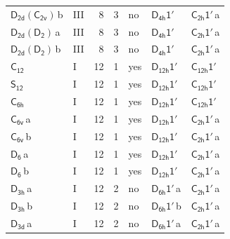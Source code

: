 \documentclass[10pt,a4paper]{article}
\numberwithin{equation}{section}
\newcommand{\grp}[1]{\mathsf{#1}}
\newcommand{\clsletter}[1]{\,{\scriptsize\color{black!55}#1}}
\begin{document}
{\begin{longtable}{@{}llrrlll@{}}
\href{D2d-C2v.pdf}{$\grp{D_{2d}}(\grp{C_{2v}})$}\clsletter{b} & III & 8 & 3 & no & \href{D4h-1p.pdf}{$\grp{D_{4h}1'}$} & \href{C2h-1p.pdf}{$\grp{C_{2h}1'}$}\clsletter{a}\\
\href{D2d-D2.pdf}{$\grp{D_{2d}}(\grp{D_{2}})$}\clsletter{a} & III & 8 & 3 & no & \href{D4h-1p.pdf}{$\grp{D_{4h}1'}$} & \href{C2h-1p.pdf}{$\grp{C_{2h}1'}$}\clsletter{a}\\
\href{D2d-D2.pdf}{$\grp{D_{2d}}(\grp{D_{2}})$}\clsletter{b} & III & 8 & 3 & no & \href{D4h-1p.pdf}{$\grp{D_{4h}1'}$} & \href{C2h-1p.pdf}{$\grp{C_{2h}1'}$}\clsletter{a}\\
\href{../../../rotation/data/pdf/C12.pdf}{$\grp{C_{12}}$} & I & 12 & 1 & yes & \href{D12h-1p.pdf}{$\grp{D_{12h}1'}$} & \href{C12h-1p.pdf}{$\grp{C_{12h}1'}$}\\
\href{../../../rotation/data/pdf/S12.pdf}{$\grp{S_{12}}$} & I & 12 & 1 & yes & \href{D12h-1p.pdf}{$\grp{D_{12h}1'}$} & \href{C12h-1p.pdf}{$\grp{C_{12h}1'}$}\\
\href{../../../rotation/data/pdf/C6h.pdf}{$\grp{C_{6h}}$} & I & 12 & 1 & yes & \href{D12h-1p.pdf}{$\grp{D_{12h}1'}$} & \href{C12h-1p.pdf}{$\grp{C_{12h}1'}$}\\
\href{../../../rotation/data/pdf/C6v.pdf}{$\grp{C_{6v}}$}\clsletter{a} & I & 12 & 1 & yes & \href{D12h-1p.pdf}{$\grp{D_{12h}1'}$} & \href{C2h-1p.pdf}{$\grp{C_{2h}1'}$}\clsletter{a}\\
\href{../../../rotation/data/pdf/C6v.pdf}{$\grp{C_{6v}}$}\clsletter{b} & I & 12 & 1 & yes & \href{D12h-1p.pdf}{$\grp{D_{12h}1'}$} & \href{C2h-1p.pdf}{$\grp{C_{2h}1'}$}\clsletter{a}\\
\href{../../../rotation/data/pdf/D6.pdf}{$\grp{D_{6}}$}\clsletter{a} & I & 12 & 1 & yes & \href{D12h-1p.pdf}{$\grp{D_{12h}1'}$} & \href{C2h-1p.pdf}{$\grp{C_{2h}1'}$}\clsletter{a}\\
\href{../../../rotation/data/pdf/D6.pdf}{$\grp{D_{6}}$}\clsletter{b} & I & 12 & 1 & yes & \href{D12h-1p.pdf}{$\grp{D_{12h}1'}$} & \href{C2h-1p.pdf}{$\grp{C_{2h}1'}$}\clsletter{a}\\
\href{../../../rotation/data/pdf/D3h.pdf}{$\grp{D_{3h}}$}\clsletter{a} & I & 12 & 2 & no & \href{D6h-1p.pdf}{$\grp{D_{6h}1'}$}\clsletter{a} & \href{C2h-1p.pdf}{$\grp{C_{2h}1'}$}\clsletter{a}\\
\href{../../../rotation/data/pdf/D3h.pdf}{$\grp{D_{3h}}$}\clsletter{b} & I & 12 & 2 & no & \href{D6h-1p.pdf}{$\grp{D_{6h}1'}$}\clsletter{b} & \href{C2h-1p.pdf}{$\grp{C_{2h}1'}$}\clsletter{a}\\
\href{../../../rotation/data/pdf/D3d.pdf}{$\grp{D_{3d}}$}\clsletter{a} & I & 12 & 2 & no & \href{D6h-1p.pdf}{$\grp{D_{6h}1'}$}\clsletter{a} & \href{C2h-1p.pdf}{$\grp{C_{2h}1'}$}\clsletter{a}\\

\end{longtable}}
\end{document}

